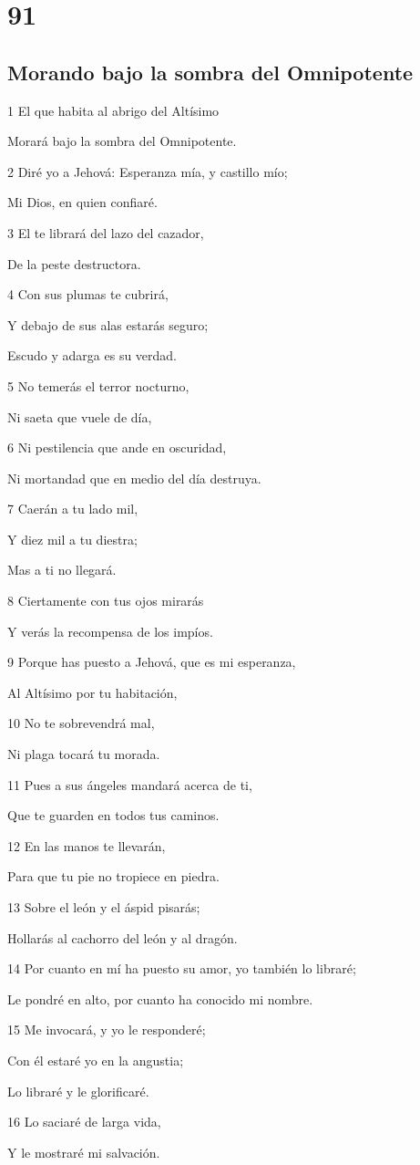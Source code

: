 \chapter{91}

\section*{Morando bajo la sombra del Omnipotente}

\par 1 El que habita al abrigo del Altísimo
\par Morará bajo la sombra del Omnipotente.
\par 2 Diré yo a Jehová: Esperanza mía, y castillo mío;
\par Mi Dios, en quien confiaré.
\par 3 El te librará del lazo del cazador,
\par De la peste destructora.
\par 4 Con sus plumas te cubrirá,
\par Y debajo de sus alas estarás seguro;
\par Escudo y adarga es su verdad.
\par 5 No temerás el terror nocturno,
\par Ni saeta que vuele de día,
\par 6 Ni pestilencia que ande en oscuridad,
\par Ni mortandad que en medio del día destruya.
\par 7 Caerán a tu lado mil,
\par Y diez mil a tu diestra;
\par Mas a ti no llegará.
\par 8 Ciertamente con tus ojos mirarás
\par Y verás la recompensa de los impíos.
\par 9 Porque has puesto a Jehová, que es mi esperanza,
\par Al Altísimo por tu habitación,
\par 10 No te sobrevendrá mal,
\par Ni plaga tocará tu morada.
\par 11 Pues a sus ángeles mandará acerca de ti,
\par Que te guarden en todos tus caminos.
\par 12 En las manos te llevarán,
\par Para que tu pie no tropiece en piedra.
\par 13 Sobre el león y el áspid pisarás;
\par Hollarás al cachorro del león y al dragón.
\par 14 Por cuanto en mí ha puesto su amor, yo también lo libraré;
\par Le pondré en alto, por cuanto ha conocido mi nombre.
\par 15 Me invocará, y yo le responderé;
\par Con él estaré yo en la angustia;
\par Lo libraré y le glorificaré.
\par 16 Lo saciaré de larga vida,
\par Y le mostraré mi salvación.

